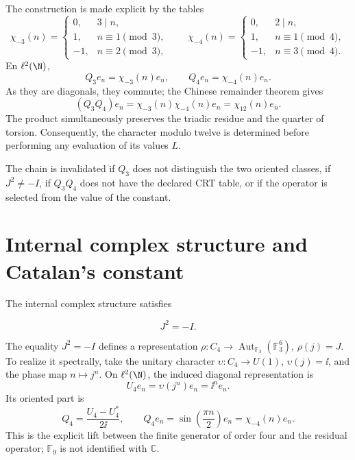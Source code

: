 The construction is made explicit by the tables
\begin{equation}
\chi_{-3}(n)=
\begin{cases}
0,&3\mid n,\\
1,&n\equiv1\pmod3,\\
-1,&n\equiv2\pmod3,
\end{cases}
\qquad
\chi_{-4}(n)=
\begin{cases}
0,&2\mid n,\\
1,&n\equiv1\pmod4,\\
-1,&n\equiv3\pmod4.
\end{cases}
\label{eq:characters34-tables}
\end{equation}
En \(\ell^2(\N)\),
\[
Q_3e_n=\chi_{-3}(n)e_n,
\qquad Q_4e_n=\chi_{-4}(n)e_n.
\]
As they are diagonals, they commute; the Chinese remainder theorem gives
\begin{equation}
(Q_3Q_4)e_n=\chi_{-3}(n)\chi_{-4}(n)e_n
=\chi_{12}(n)e_n.
\label{eq:q12-product-proof}
\end{equation}
The product simultaneously preserves the triadic residue and the quarter of
torsion. Consequently, the character modulo twelve is determined
before performing any evaluation of its values \(L\).

\begin{remark}
The chain is invalidated if \(Q_3\) does not distinguish the two oriented classes,
if \(J^2\ne-I\), if \(Q_3Q_4\) does not have the declared CRT table, or if the
operator is selected from the value of the constant.
\end{remark}

\section{Internal complex structure and Catalan's constant}

The internal complex structure satisfies

\begin{equation}
J^2=-I.
\label{eq:J-square}
\end{equation}

The equality \(J^2=-I\) defines a representation
\(\rho:C_4\to\operatorname{Aut}_{\mathbb F_3}(\mathbb F_3^6)\),
\(\rho(j)=J\). To realize it spectrally, take the unitary character
\(\upsilon:C_4\to U(1)\), \(\upsilon(j)=\ii\), and the phase map
\(n\mapsto j^n\). On \(\ell^2(\N)\), the induced diagonal representation
is
\[
U_4e_n=\upsilon(j^n)e_n=\ii^ne_n.
\]
Its oriented part is
\[
Q_4=\frac{U_4-U_4^*}{2\ii},\qquad
Q_4e_n=\sin\!\left(\frac{\pi n}{2}\right)e_n
=\chi_{-4}(n)e_n.
\]
This is the explicit lift between the finite generator of order four and the
residual operator; \(\mathbb F_9\) is not identified with \(\mathbb C\).

